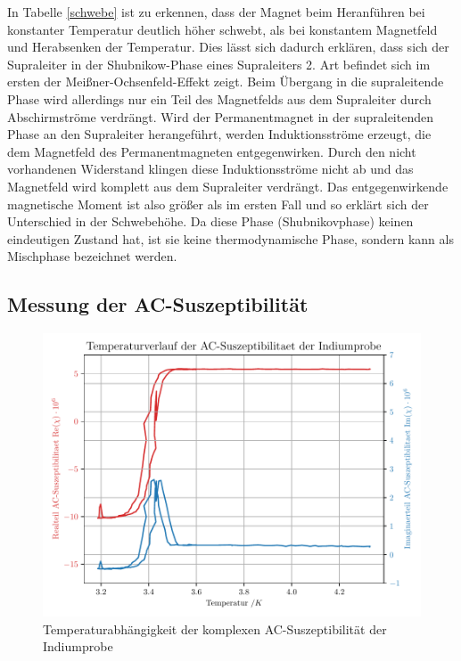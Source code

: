 In Tabelle \ref{schwebe} ist zu erkennen, dass der Magnet beim Heranführen bei konstanter Temperatur deutlich höher schwebt, als bei konstantem Magnetfeld und Herabsenken der Temperatur. Dies lässt sich dadurch erklären, dass sich der Supraleiter in der Shubnikow-Phase eines Supraleiters 2. Art befindet sich im ersten der Meißner-Ochsenfeld-Effekt zeigt. Beim Übergang in die supraleitende Phase wird allerdings nur ein Teil des Magnetfelds aus dem Supraleiter durch Abschirmströme verdrängt. Wird der Permanentmagnet in der supraleitenden Phase an den Supraleiter herangeführt, werden Induktionsströme erzeugt, die dem Magnetfeld des Permanentmagneten entgegenwirken. Durch den nicht vorhandenen Widerstand klingen diese Induktionsströme nicht ab und das Magnetfeld wird komplett aus dem Supraleiter verdrängt. Das entgegenwirkende magnetische Moment ist also größer als im ersten Fall und so erklärt sich der Unterschied in der Schwebehöhe. Da diese Phase (Shubnikovphase) keinen eindeutigen Zustand hat, ist sie keine thermodynamische Phase, sondern kann als Mischphase bezeichnet werden.

\subsection{Messung der AC-Suszeptibilität}

\begin{figure}[h]
\includegraphics[width=\textwidth]{Temperaturverlauf_der_AC-Suszeptibilitaet_der_Indiumprobe.pdf}

\caption{Temperaturabhängigkeit der komplexen AC-Suszeptibilität der Indiumprobe}
\label{ac-sus}
\end{figure}

